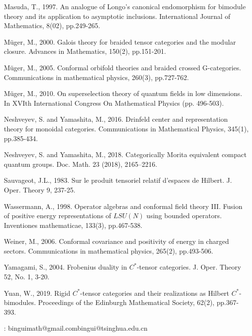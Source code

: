 \documentclass[11pt,b5paper,notitlepage]{article}
\theoremstyle{definition}
\theoremstyle{plain}
\numberwithin{equation}{section}
\begin{document}
\begin{thebibliography}{999999}
Masuda, T., 1997. An analogue of Longo's canonical endomorphism for bimodule theory and its application to asymptotic inclusions. International Journal of Mathematics, 8(02), pp.249-265.

Müger, M., 2000. Galois theory for braided tensor categories and the modular closure. Advances in Mathematics, 150(2), pp.151-201.

Müger, M., 2005. Conformal orbifold theories and braided crossed G-categories. Communications in mathematical physics, 260(3), pp.727-762.

Müger, M., 2010. On superselection theory of quantum fields in low dimensions. In XVIth International Congress On Mathematical Physics (pp. 496-503).

Neshveyev, S. and Yamashita, M., 2016. Drinfeld center and representation theory for monoidal categories. Communications in Mathematical Physics, 345(1), pp.385-434.

Neshveyev, S. and Yamashita, M., 2018. Categorically Morita equivalent compact quantum
groups. Doc. Math. 23 (2018), 2165–2216.

Sauvageot, J.L., 1983. Sur le produit tensoriel relatif d'espaces de Hilbert. J. Oper. Theory 9, 237-25.

Wassermann, A., 1998. Operator algebras and conformal field theory III. Fusion of positive energy representations of $LSU(N)$ using bounded operators. Inventiones mathematicae, 133(3), pp.467-538.

Weiner, M., 2006. Conformal covariance and positivity of energy in charged sectors. Communications in mathematical physics, 265(2), pp.493-506.

Yamagami, S., 2004. Frobenius duality in $C^*$-tensor categories. J. Oper. Theory 52, No. 1, 3-20.

Yuan, W., 2019. Rigid $C^*$-tensor categories and their realizations as Hilbert $C^*$-bimodules. Proceedings of the Edinburgh Mathematical Society, 62(2), pp.367-393.

		
		
\end{thebibliography}


: binguimath@gmail.com\qquad bingui@tsinghua.edu.cn
\end{document}
